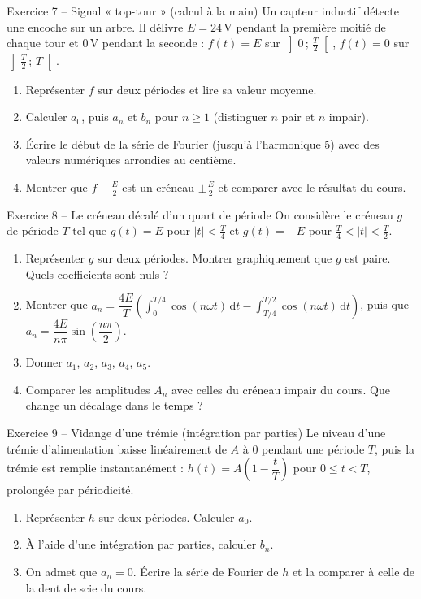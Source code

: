 \documentclass[a4paper,11pt]{article}
\begin{document}
\begin{exo}{Exercice 7 -- Signal « top-tour » (calcul à la main)}
\label{exo:7}
Un capteur inductif détecte une encoche sur un arbre. Il délivre $E = 24$\,V pendant la première moitié de chaque tour et $0$\,V pendant la seconde : $f(t) = E$ sur $\left]0\,;\,\frac T2\right[$, $f(t) = 0$ sur $\left]\frac T2\,;\,T\right[$.
\begin{enumerate}[label=\alph*)]
  \item Représenter $f$ sur deux périodes et lire sa valeur moyenne.
  \item Calculer $a_0$, puis $a_n$ et $b_n$ pour $n\geq 1$ (distinguer $n$ pair et $n$ impair).
  \item Écrire le début de la série de Fourier (jusqu'à l'harmonique 5) avec des valeurs numériques arrondies au centième.
  \item Montrer que $f - \frac E2$ est un créneau $\pm\frac E2$ et comparer avec le résultat du cours.
\end{enumerate}
\end{exo}

\begin{exo}{Exercice 8 -- Le créneau décalé d'un quart de période}
\label{exo:8}
On considère le créneau $g$ de période $T$ tel que $g(t) = E$ pour $|t| < \frac T4$ et $g(t) = -E$ pour $\frac T4 < |t| < \frac T2$.
\begin{enumerate}[label=\alph*)]
  \item Représenter $g$ sur deux périodes. Montrer graphiquement que $g$ est paire. Quels coefficients sont nuls ?
  \item Montrer que $a_n = \dfrac{4E}{T}\left(\displaystyle\int_0^{T/4}\cos(n\omega t)\,\mathrm dt - \int_{T/4}^{T/2}\cos(n\omega t)\,\mathrm dt\right)$, puis que $a_n = \dfrac{4E}{n\pi}\sin\left(\dfrac{n\pi}{2}\right)$.
  \item Donner $a_1$, $a_2$, $a_3$, $a_4$, $a_5$.
  \item Comparer les amplitudes $A_n$ avec celles du créneau impair du cours. Que change un décalage dans le temps ?
\end{enumerate}
\end{exo}

\begin{exo}{Exercice 9 -- Vidange d'une trémie (intégration par parties)}
\label{exo:9}
Le niveau d'une trémie d'alimentation baisse linéairement de $A$ à $0$ pendant une période $T$, puis la trémie est remplie instantanément : $h(t) = A\left(1 - \dfrac tT\right)$ pour $0\leq t < T$, prolongée par périodicité.
\begin{enumerate}[label=\alph*)]
  \item Représenter $h$ sur deux périodes. Calculer $a_0$.
  \item À l'aide d'une intégration par parties, calculer $b_n$.
  \item On admet que $a_n = 0$. Écrire la série de Fourier de $h$ et la comparer à celle de la dent de scie du cours.
\end{enumerate}
\end{exo}
\end{document}
